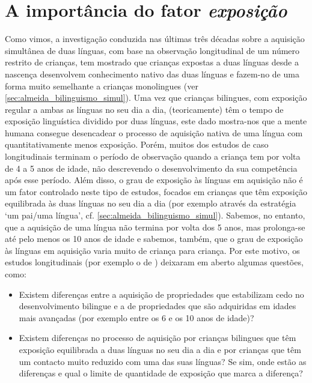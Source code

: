 \documentclass[output=paper]{LSP/langsci}
\begin{document}
\section{A importância do fator \textit{exposição}}%
\label{sec:almeida_importancia}

Como vimos, a investigação conduzida nas últimas três décadas sobre a aquisição simultânea de duas línguas, com base na observação longitudinal de um número restrito de crianças, tem mostrado que crianças expostas a duas línguas desde a nascença desenvolvem conhecimento nativo das duas línguas e fazem-no de uma forma muito semelhante a crianças monolingues (ver \ref{sec:almeida_bilinguismo_simul}). Uma vez que crianças bilingues, com exposição regular a ambas as línguas no seu dia a dia, (teoricamente) têm o tempo de exposição linguística dividido por duas línguas, este dado mostra-nos que a mente humana consegue desencadear o processo de aquisição nativa de uma língua com quantitativamente menos exposição. Porém, muitos dos estudos de caso longitudinais terminam o período de observação quando a criança tem por volta de 4 a 5 anos de idade, não descrevendo o desenvolvimento da sua competência após esse período. Além disso, o grau de exposição às línguas em aquisição não é um fator controlado neste tipo de estudos, focados em crianças que têm exposição equilibrada às duas línguas no seu dia a dia (por exemplo através da estratégia `um pai/uma língua', cf. \ref{sec:almeida_bilinguismo_simul}). Sabemos, no entanto, que a aquisição de uma língua não termina por volta dos 5 anos, mas prolonga-se até pelo menos os 10 anos de idade e sabemos, também, que o grau de exposição às línguas em aquisição varia muito de criança para criança. Por este motivo, os estudos longitudinais (por exemplo o de \citealt{leisel1989}) deixaram em aberto algumas questões, como:

\begin{itemize}
\item Existem diferenças entre a aquisição de propriedades que estabilizam cedo no desenvolvimento bilingue e a de propriedades que são adquiridas em idades mais avançadas (por exemplo entre os 6 e os 10 anos de idade)?
\item Existem diferenças no processo de aquisição por crianças bilingues que têm exposição equilibrada a duas línguas no seu dia a dia e por crianças que têm um contacto muito reduzido com uma das suas línguas? Se sim, onde estão as diferenças e qual o limite de quantidade de exposição que marca a diferença?
\end{itemize}
\end{document}
